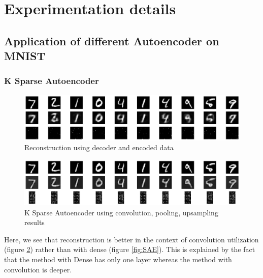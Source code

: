 \section{Experimentation details}
\subsection{Application of different Autoencoder on MNIST}
\subsubsection{K Sparse Autoencoder}
\begin{figure}[h]
 \centering
 \includegraphics[scale=0.4]{SAE.png}
 \caption{Reconstruction using decoder and encoded data}
 \label{fig:SAE_result}
\end{figure}

\begin{figure}[h]
 \centering
 \includegraphics[scale=0.4]{KSparseAE_CONV.png}
 \caption{K Sparse Autoencoder using convolution, pooling, upsampling results}
 \label{fig:SAEconv}
\end{figure}
Here, we see that reconstruction is better in the context of convolution utilization (figure \ref{fig:SAEconv}) rather than with dense (figure \ref{fig:SAE}). This is explained by the fact that the method with Dense has only one layer whereas the method with convolution is deeper.
